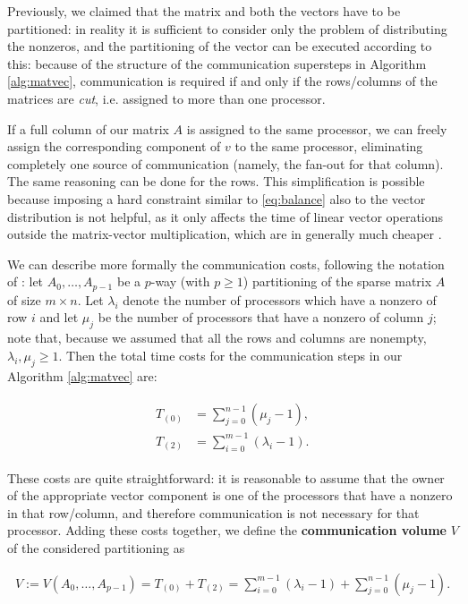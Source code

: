 Previously, we claimed that the matrix and both the vectors have to be partitioned: in reality it is sufficient to consider only the problem of distributing the nonzeros, and the partitioning of the vector can be executed according to this: because of the structure of the communication supersteps in Algorithm \ref{alg:matvec}, communication is required if and only if the rows/columns of the matrices are \emph{cut}, i.e. assigned to more than one processor.

If a full column of our matrix $A$ is assigned to the same processor, we can freely assign the corresponding component of $v$ to the same processor, eliminating completely one source of communication (namely, the fan-out for that column). The same reasoning can be done for the rows. This simplification is possible because imposing a hard constraint similar to \eqref{eq:balance} also to the vector distribution is not helpful, as it only affects the time of linear vector operations outside the matrix-vector multiplication, which are in generally much cheaper \cite[Sec.~3]{mondriaan}. 

We can describe more formally the communication costs, following the notation of \cite[Def.~2.1]{mondriaan}: let $A_0,\dots,A_{p-1}$ be a $p$-way (with $p \geq 1$) partitioning of the sparse matrix $A$ of size $m \times n$. Let $\lambda_i$ denote the number of processors which have a nonzero of row $i$ and let $\mu_j$ be the number of processors that have a nonzero of column $j$; note that, because we assumed that all the rows and columns are nonempty, $\lambda_i, \mu_j \geq 1$. Then the total time costs for the communication steps in our Algorithm \ref{alg:matvec} are:

\begin{align}
	\begin{aligned}
		T_{(0)} &= \sum_{j=0}^{n-1} (\mu_j -1), \\
		T_{(2)} &= \sum_{i=0}^{m-1} (\lambda_i -1).
	\end{aligned} \label{eq:T_comm}
\end{align}

These costs are quite straightforward: it is reasonable to assume that the owner of the appropriate vector component is one of the processors that have a nonzero in that row/column, and therefore communication is not necessary for that processor. Adding these costs together, we define the \textbf{communication volume} $V$ of the considered partitioning as

\begin{align}
	V := V(A_0,\dots,A_{p-1}) = T_{(0)} + T_{(2)} = \sum_{i=0}^{m-1} (\lambda_i -1) + \sum_{j=0}^{n-1} (\mu_j-1).
	\label{eq:volume}
\end{align}

